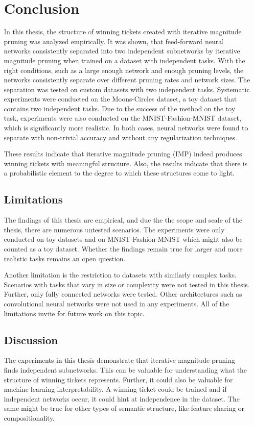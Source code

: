 \chapter{Conclusion}\label{chapter:conclusion} 

In this thesis, the structure of winning tickets created with iterative magnitude pruning was analyzed empirically.
It was shown, that feed-forward neural networks consistently separated into two independent subnetworks by iterative magnitude pruning when trained on a dataset with independent tasks.
With the right conditions, such as a large enough network and enough pruning levels, the networks consistently separate over different pruning rates and network sizes.
The separation was tested on custom datasets with two independent tasks.
Systematic experiments were conducted on the Moons-Circles dataset, a toy dataset that contains two independent tasks.
Due to the success of the method on the toy task, experiments were also conducted on the MNIST-Fashion-MNIST dataset, which is significantly more realistic.
In both cases, neural networks were found to separate with non-trivial accuracy and without any regularization techniques.

These results indicate that iterative magnitude pruning (IMP) indeed produces winning tickets with meaningful structure.
Also, the results indicate that there is a probabilistic element to the degree to which these structures come to light.

\section{Limitations}
The findings of this thesis are empirical, and due the the scope and scale of the thesis, there are numerous untested scenarios.
The experiments were only conducted on toy datasets and on MNIST-Fashion-MNIST which might also be counted as a toy dataset.
Whether the findings remain true for larger and more realistic tasks remains an open question.

Another limitation is the restriction to datasets with similarly complex tasks.
Scenarios with tasks that vary in size or complexity were not tested in this thesis.
Further, only fully connected networks were tested.
Other architectures such as convolutional neural networks were not used in any experiments.
All of the limitations invite for future work on this topic.

\section{Discussion}
The experiments in this thesis demonstrate that iterative magnitude pruning finds independent subnetworks.
This can be valuable for understanding what the structure of winning tickets represents.
Further, it could also be valuable for machine learning interpretability.
A winning ticket could be trained and if independent networks occur, it could hint at independence in the dataset.
The same might be true for other types of semantic structure, like feature sharing or compositionality.

